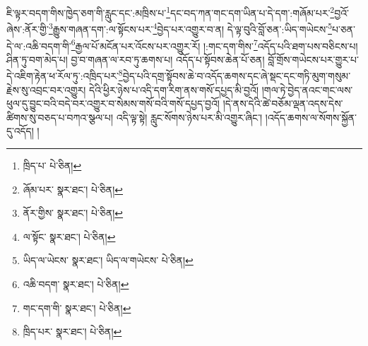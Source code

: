 ཇི་ལྟར་བདག་གིས་ཁྱེད་ཅག་གི་རླུང་དང་:མཁྲིས་པ་\footnote{ཁྲིད་པ་  པེ་ཅིན། }དང་བད་ཀན་གང་དག་ཡིན་པ་དེ་དག་:གཞོམ་པར་\footnote{ཞོམ་པར་  སྣར་ཐང་།  པེ་ཅིན། }བྱའོ་ཞེས་:ནོར་གྱི་\footnote{ནོར་གྱིས་  སྣར་ཐང་།  པེ་ཅིན། }རྒྱུས་གཞན་དག་:ལ་སྟོངས་པར་\footnote{ལ་སྟོང་  སྣར་ཐང་།  པེ་ཅིན། }བྱེད་པར་འགྱུར་བ་ན། དེ་ལྟ་བུའི་བློ་ཅན་:ཡིད་གཡེངས་\footnote{ཡིད་ལ་ཡེངས་  སྣར་ཐང་། ཡིད་ལ་གཡེངས་  པེ་ཅིན། }པ་ཅན་དེ་ལ་:འཆི་བདག་གི་\footnote{འཆི་བདག་  སྣར་ཐང་།  པེ་ཅིན། }རྒྱལ་པོ་མངོན་པར་འོངས་པར་འགྱུར་རོ། །:གང་དག་གིས་\footnote{གང་དག་གི་  སྣར་ཐང་།  པེ་ཅིན། }འདོད་པའི་ཐག་པས་བཅིངས་པ། ཤིན་ཏུ་བག་མེད་པ། བྱ་བ་གཞན་ལ་རབ་ཏུ་ཆགས་པ། འདོད་པ་སྟོབས་ཆེན་པོ་ཅན། བློ་གྲོས་གཡེངས་པར་གྱུར་པ་དེ་འཇིག་རྟེན་ཕ་རོལ་ཏུ་:འཁྲིད་པར་\footnote{ཁྲིད་པར་  སྣར་ཐང་།  པེ་ཅིན། }བྱེད་པའི་དགྲ་སྟོབས་ཆེ་བ་འདོད་ཆགས་དང་ཞེ་སྡང་དང་གཏི་མུག་གསུམ་རྗེས་སུ་འབྲང་བར་འགྱུར། དེའི་ཕྱིར་ཉེས་པ་འདི་དག་རིག་ནས་གསོ་དཔྱད་མི་བྱའོ། །གལ་ཏེ་བྱེད་ནའང་གང་ལས་ཕུལ་དུ་བྱུང་བའི་བདེ་བར་འགྱུར་བ་སེམས་གསོ་བའི་གསོ་དཔྱད་བྱའོ། །དེ་ནས་དེའི་ཚེ་བཅོམ་ལྡན་འདས་དེས་ཚིགས་སུ་བཅད་པ་བཀའ་སྩལ་པ། འདི་ལྟ་སྟེ། རླུང་སོགས་ཉེས་པར་མི་འགྱུར་ཞིང་། །འདོད་ཆགས་ལ་སོགས་སྐྱོན་དུ་འདོད། །
